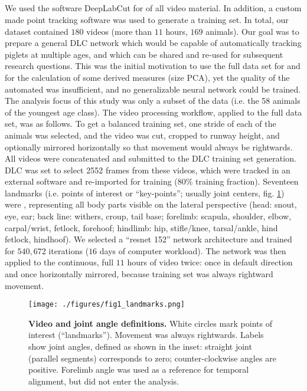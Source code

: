 \subsection{}
\label{sec:org3ecf574}
We used the software DeepLabCut \citep[DLC,][]{Mathis2018} for  of all video material.
In addition, a custom made point tracking software \citep{MMielke2020} was used to generate a training set.
In total, our dataset contained \(180\) videos (more than \(11\) hours, \(169\) animals).
Our goal was to prepare a general DLC network which would be capable of automatically tracking piglets at multiple ages, and which can be shared and re-used for subsequent research questions.
This was the initial motivation to use the full data set for  and for the calculation of some derived measures (size PCA), yet the quality of the automated  was insufficient, and no generalizable neural network could be trained.
The analysis focus of this study was only a subset of the data (i.e. the 58 animals of the youngest age class).
The video processing workflow, applied to the full data set, was as follows.
To get a balanced training set, one stride of each of the animals was selected, and the video was cut, cropped to runway height, and optionally mirrored horizontally so that movement would always be rightwards.
All videos were concatenated and submitted to the DLC training set generation.
DLC was set to select 2552 frames from these videos, which were tracked in an external software and re-imported for training (\(80 \%\) training fraction).
Seventeen landmarks (i.e. points of interest or ``key-points''; usually joint centers, fig. \ref{fig:landmarks}) were , representing all body parts visible on the lateral perspective (head: snout, eye, ear; back line: withers, croup, tail base; forelimb: scapula, shoulder, elbow, carpal/wrist, fetlock, forehoof; hindlimb: hip, stifle/knee, tarsal/ankle, hind fetlock, hindhoof).
We selected a ``resnet 152'' network architecture and trained for \(540,672\) iterations (\(16\) days of computer workload).
The network was then applied to  the continuous, full \(11\) hours of video twice: once in default direction and once horizontally mirrored, because training set was always rightward movement.

\begin{figure}[p]
\centering
\texttt{[image: ./figures/fig1\_landmarks.png]}
\caption{\label{fig:landmarks}\textbf{Video  and joint angle definitions.} White circles mark points of interest (``landmarks''). Movement was always rightwards. Labels show joint angles, defined as shown in the inset: straight joint (parallel segments) corresponds to zero; counter-clockwise  angles are positive. Forelimb  angle was used as a reference for temporal alignment, but did not enter the analysis.}
\end{figure}



